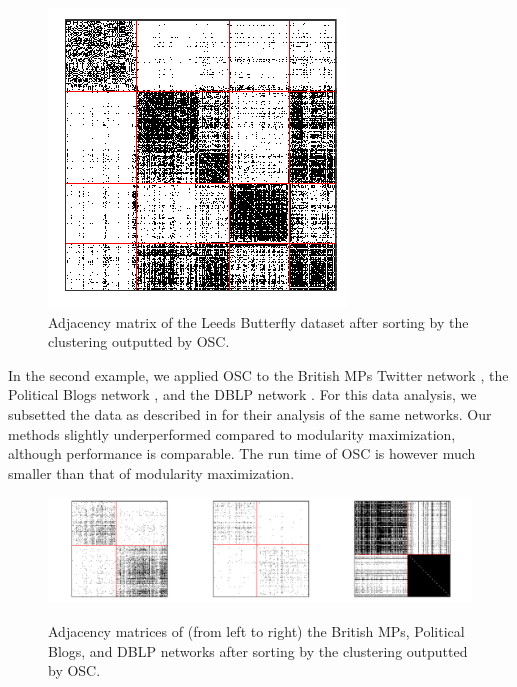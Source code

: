 \documentclass[12pt]{article}
\begin{document}
\begin{figure}[H]

{\centering \includegraphics{summary_files/figure-latex/butterfly-1}

}

\caption{Adjacency matrix of the Leeds Butterfly dataset 
after sorting by the clustering outputted by OSC.}\label{fig:butterfly}
\end{figure}

In the second example, we applied OSC to the British MPs Twitter network
\citep{greene2013producing}, the Political Blogs network
\citep{10.1145/1134271.1134277}, and the DBLP network
\citep{NIPS2009_3855, 10.1007/978-3-642-15880-3_42}. For this data
analysis, we subsetted the data as described in
\citet{307cbeb9b1be48299388437423d94bf1} for their analysis of the
same networks. Our methods slightly underperformed compared to modularity
maximization, although performance is comparable. The run time of OSC
is however much smaller than that of modularity maximization.

\begin{figure}[H]
{\centering \includegraphics{summary_files/figure-latex/mp-1}
}
\caption{Adjacency matrices of (from left to right) the British MPs, Political Blogs, and DBLP networks after sorting by the clustering outputted by OSC.}\label{fig:mp}
\end{figure}
\end{document}
